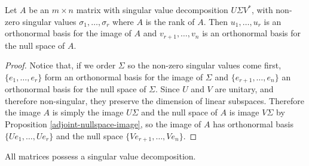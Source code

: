 \begin{prop}
    Let $A$ be an $m \times n$ matrix with singular value decomposition $U\Sigma V^{*}$, with non-zero singular values $\sigma_1, \ldots, \sigma_r$ where $A$ is the rank of $A$. Then $u_1, \ldots, u_r$ is an orthonormal basis for the image of $A$ and $v_{r+1}, \ldots, v_n$ is an orthonormal basis for the null space of $A$.
\end{prop}

\begin{proof}
    Notice that, if we order $\Sigma$ so the non-zero singular values come first, $\{e_1, \ldots, e_r\}$ form an orthonormal basis for the image of $\Sigma$ and $\{e_{r+1}, \ldots, e_n\}$ an orthonormal basis for the null space of $\Sigma$. Since $U$ and $V$ are unitary, and therefore non-singular, they preserve the dimension of linear subspaces. Therefore the image $A$ is simply the image $U\Sigma$ and the null space of $A$ is image $V\Sigma$ by Proposition \ref{adjoint-nullspace-image}, so the image of $A$ has orthonormal basis $\{Ue_1, \ldots, Ue_{r}\}$ and the null space $\{Ve_{r+1}, \ldots, Ve_{n}\}$.
\end{proof}

\begin{thm}
    All matrices possess a singular value decomposition.
\end{thm}

